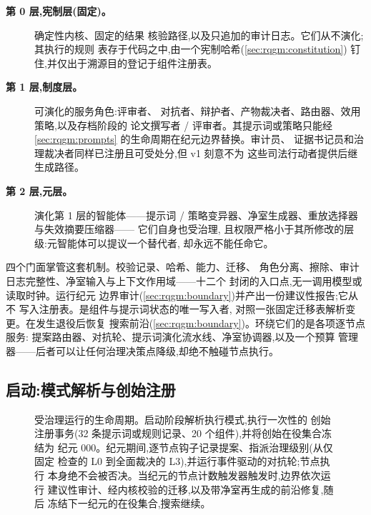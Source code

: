 \begin{description}
  \item[\textbf{第 0 层,宪制层(固定)。}] 确定性内核、固定的结果
        核验路径,以及只追加的审计日志。它们从不演化;其执行的规则
        表存于代码之中,由一个宪制哈希(\cref{sec:rqgm:constitution})
        钉住,并仅出于溯源目的登记于组件注册表。
  \item[\textbf{第 1 层,制度层。}] 可演化的服务角色:评审者、
        对抗者、辩护者、产物裁决者、路由器、效用策略,以及存档阶段的
        论文撰写者 / 评审者。其提示词或策略只能经
        \cref{sec:rqgm:prompts} 的生命周期在纪元边界替换。审计员、
        证据书记员和治理裁决者同样已注册且可受处分,但 v1 刻意不为
        这些司法行动者提供后继生成路径。
  \item[\textbf{第 2 层,元层。}] 演化第 1 层的智能体——提示词
        / 策略变异器、净室生成器、重放选择器与失效摘要压缩器——
        它们自身也受治理,
        且权限严格小于其所修改的层级:元智能体可以提议一个替代者,
        却永远不能任命它。
\end{description}

四个门面掌管这套机制。校验记录、哈希、能力、迁移、
角色分离、擦除、审计日志完整性、净室输入与上下文作用域——十二个
封闭的入口点,无一调用模型或读取时钟。运行纪元
边界审计(\cref{sec:rqgm:boundary})并产出一份建议性报告;它从不
写入注册表。是组件与提示词状态的唯一写入者,
对照一张固定迁移表解析变更。在发生退役后恢复
搜索前沿(\cref{sec:rqgm:boundary})。环绕它们的是各项逐节点服务:
提案路由器、对抗轮、提示词演化流水线、净室协调器,以及一个预算
管理器——后者可以让任何治理决策点降级,却绝不触碰节点执行。

\subsection{启动:模式解析与创始注册}\label{sec:rqgm:boot}

\begin{figure}[t]
  \centering
  \resizebox{\columnwidth}{!}{}
  \caption{受治理运行的生命周期。启动阶段解析执行模式,执行一次性的
    创始注册事务(32 条提示词或规则记录、20 个组件),并将创始在役集合冻结为
    纪元 000。纪元期间,逐节点钩子记录提案、指派治理级别(从仅固定
    检查的 L0 到全面裁决的 L3),并运行事件驱动的对抗轮;节点执行
    本身绝不会被否决。当纪元的节点计数触发器触发时,边界依次运行
    建议性审计、经内核校验的迁移,以及带净室再生成的前沿修复,随后
    冻结下一纪元的在役集合,搜索继续。}
  \label{fig:rqgm-lifecycle}
\end{figure}

